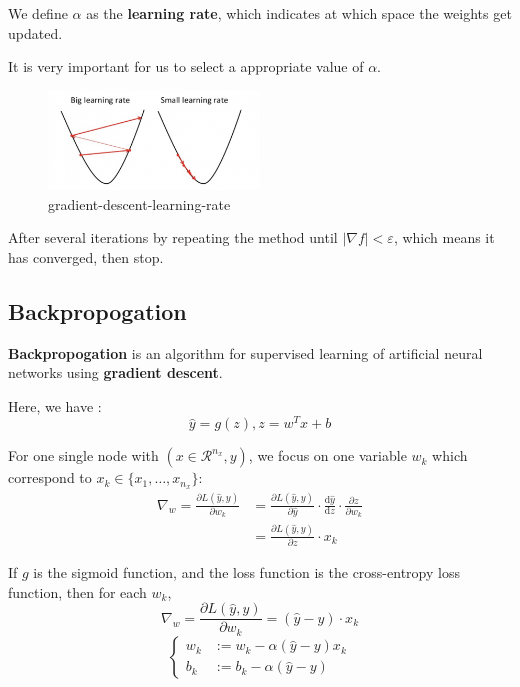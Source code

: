 \documentclass[11pt, a4paper]{article}
\begin{document}
We define $\alpha$ as the \textbf{learning rate}, which indicates at which space the weights get updated.

It is very important for us to select a appropriate value of $\alpha$.
\begin{figure}[H] %
    \centering
    \includegraphics[width=0.5\textwidth]{./fig/gradient-descent-learning-rate.png}
    \caption{gradient-descent-learning-rate}
    \label{fig:gradient-descent-learning-rate}
\end{figure}

After several iterations by repeating the method until $|\nabla f|< \varepsilon$, which means it has converged, then stop.

\subsection{Backpropogation}

\textbf{Backpropogation} is an algorithm for supervised learning of artificial neural networks using \textbf{gradient descent}.

Here, we have :
\[
\hat{y} = g(z), z = w^{T}x+b
\]

For one single node with $(x\in \mathcal{R}^{n_x},y)$, we focus on one variable $w_k$ which correspond to $x_k \in \{x_1, \ldots,x_{n_x}\}$:
\begin{align*}
    \nabla_w = \frac{\partial L(\hat{y},y)}{\partial w_k}
    &= \frac{\partial L(\hat{y},y)}{\partial \hat{y}} \cdot \frac{\text{d}\hat{y}}{\text{d}z} \cdot \frac{\partial z}{\partial w_k} \\
    &= \frac{\partial L(\hat{y},y)}{\partial z} \cdot x_k 
\end{align*}

If $g$ is the sigmoid function, and the loss function is the cross-entropy loss function, then for each $w_k$,
\[
\nabla_w =\frac{\partial L(\hat{y},y)}{\partial w_k} = (\hat{y}-y) \cdot x_k
\]
\[ \begin{cases}
    w_k &:= w_k - \alpha(\hat{y}-y)x_k \\
    b_k &:= b_k - \alpha(\hat{y}-y)
\end{cases}
\]
\end{document}
